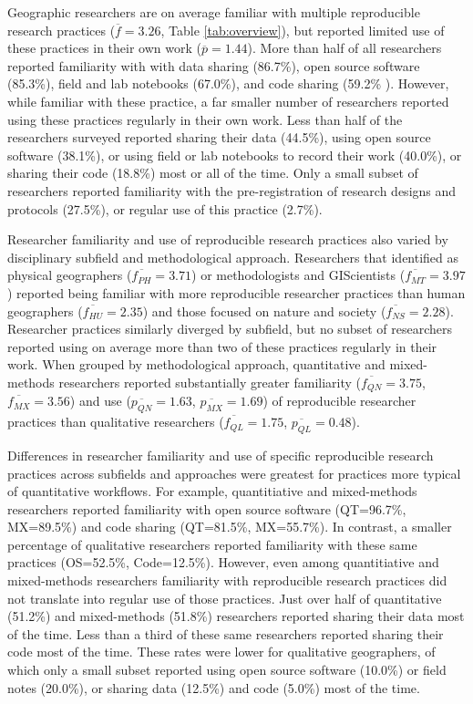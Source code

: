 \documentclass[]{interact}
\theoremstyle{plain}%
\theoremstyle{definition}
\theoremstyle{remark}
\begin{document}
Geographic researchers are on average familiar with multiple reproducible research practices ($\overline{f}=3.26$, Table \ref{tab:overview}), but reported limited use of these practices in their own work ($\overline{p}=1.44$).
More than half of all researchers reported familiarity with with data sharing (86.7\%), open source software (85.3\%), field and lab notebooks (67.0\%), and code sharing (59.2\% ).
However, while familiar with these practice, a far smaller number of researchers reported using these practices regularly in their own work. 
Less than half of the researchers surveyed reported sharing their data (44.5\%), using open source software (38.1\%), or using field or lab notebooks to record their work (40.0\%), or sharing their code (18.8\%) most or all of the time. 
Only a small subset of researchers reported familiarity with the pre-registration of research designs and protocols (27.5\%), or regular use of this practice (2.7\%).

Researcher familiarity and use of reproducible research practices also varied by disciplinary subfield and methodological approach. 
Researchers that identified as physical geographers ($\overline{f_{PH}}=3.71$) or methodologists and GIScientists ($\overline{f_{MT}}=3.97$) reported being familiar with more reproducible researcher practices than human  geographers ($\overline{f_{HU}}=2.35$) and those focused on nature and society ($\overline{f_{NS}}=2.28$).
Researcher practices similarly diverged by subfield, but no subset of researchers reported using on average more than two of these practices regularly in their work.  
When grouped by methodological approach, quantitative and mixed-methods researchers reported substantially greater familiarity ($\overline{f_{QN}}=3.75$, $\overline{f_{MX}}=3.56$) and use ($\overline{p_{QN}}=1.63$, $\overline{p_{MX}}=1.69$) of reproducible researcher practices than qualitative researchers ($\overline{f_{QL}}=1.75$, $\overline{p_{QL}}=0.48$).

Differences in researcher familiarity and use of specific reproducible research practices across subfields and approaches were greatest for practices more typical of quantitative workflows. 
For example, quantitiative and mixed-methods researchers reported familiarity with open source software (QT=96.7\%, MX=89.5\%) and code sharing (QT=81.5\%, MX=55.7\%).
In contrast, a smaller percentage of qualitative researchers reported familiarity with these same practices (OS=52.5\%, Code=12.5\%).
However, even among quantitiative and mixed-methods researchers familiarity with reproducible research practices did not translate into regular use of those practices.
Just over half of quantitative (51.2\%) and mixed-methods (51.8\%) researchers reported sharing their data most of the time.
Less than a third of these same researchers reported sharing their code most of the time. 
These rates were lower for qualitative geographers, of which only a small subset reported using open source software (10.0\%) or field notes (20.0\%), or sharing data (12.5\%) and code (5.0\%) most of the time.
\end{document}
